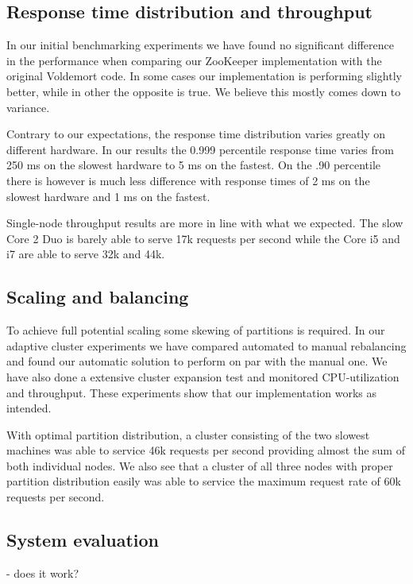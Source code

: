 \subsection{Response time distribution and throughput}
\label{eval:responsetime}
In our initial benchmarking experiments we have found no significant difference in the performance when comparing our ZooKeeper implementation with the original Voldemort code. In some cases our implementation is performing slightly better, while in other the opposite is true. We believe this mostly comes down to variance.

Contrary to our expectations, the response time distribution varies greatly on different hardware. In our results the 0.999 percentile response time varies from 250 ms on the slowest hardware to 5 ms on the fastest. On the .90 percentile there is however is much less difference with response times of 2 ms on the slowest hardware and 1 ms on the fastest.

Single-node throughput results are more in line with what we expected. The slow Core 2 Duo is barely able to serve 17k requests per second while the Core i5 and i7 are able to serve 32k and 44k. 

\subsection{Scaling and balancing}
\label{eval:balance}
To achieve full potential scaling some skewing of partitions is required. In our adaptive cluster experiments we have compared automated to manual rebalancing and found our automatic solution to perform on par with the manual one. We have also done a extensive cluster expansion test and monitored CPU-utilization and throughput. These experiments show that our implementation works as intended. 

With optimal partition distribution, a cluster consisting of the two slowest machines was able to service 46k requests per second providing almost the sum of both individual nodes. We also see that a cluster of all three nodes with proper partition distribution easily was able to service the maximum request rate of 60k requests per second. 

\subsection{System evaluation}
\label{eval:discussion}




- does it work?
	
